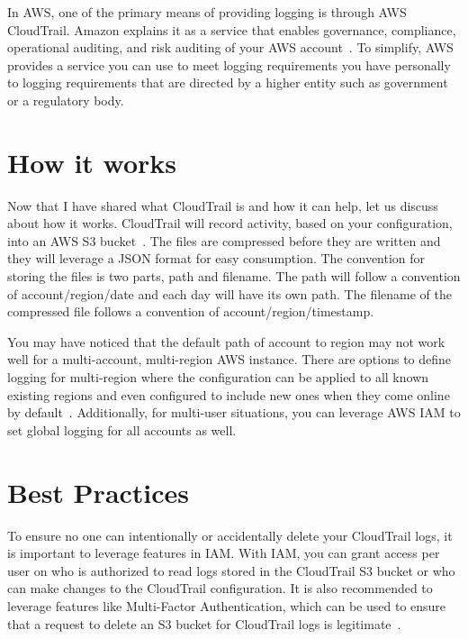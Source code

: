 In AWS, one of the primary means of providing logging is through AWS 
CloudTrail. Amazon explains it as a service that enables governance, 
compliance, operational auditing, and risk auditing of your AWS 
account~\cite{hid-sp18-518-CloudTrail-user-guide}. To simplify, AWS provides 
a service you can use to meet logging requirements you have personally to 
logging requirements that are directed by a higher entity such as government 
or a regulatory body.

\section{How it works}

Now that I have shared what CloudTrail is and how it can help, let us discuss 
about how it works. CloudTrail will record activity, based on your 
configuration, into an AWS S3 bucket~\cite{hid-sp18-518-CloudTrail-log-example}.
The files are compressed before they are written and they will leverage a JSON 
format for easy consumption. The convention for storing the files is two 
parts, path and filename. The path will follow a convention of 
account/region/date and each day will have its own path.  The filename of the 
compressed file follows a convention of account/region/timestamp. 

You may have noticed that the default path of account to region may not work 
well for a multi-account, multi-region AWS instance. There are options to 
define logging for multi-region where the configuration can be applied to all 
known existing regions and even configured to include new ones when they come 
online by default~\cite{hid-sp18-518-CloudTrail-global-events}. Additionally, 
for multi-user situations, you can leverage AWS IAM to set global logging for 
all accounts as well.

\section{Best Practices}

To ensure no one can intentionally or accidentally delete your CloudTrail logs,
it is important to leverage features in IAM. With IAM, you can grant access 
per user on who is authorized to read logs stored in the CloudTrail S3 bucket 
or who can make changes to the CloudTrail configuration. It is also recommended 
to leverage features like Multi-Factor Authentication, which can be used to 
ensure that a request to delete an S3 bucket for CloudTrail logs is 
legitimate~\cite{hid-sp18-518-CloudTrail-user-guide}. 

